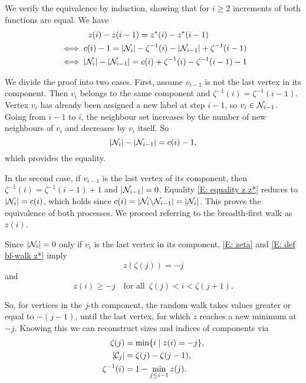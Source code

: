 We verify the equivalence by induction, showing that for $i \geq 2$ increments of both functions are equal.
We have
\begin{equation} \label{E: equality z z*}
\begin{aligned} 
&\hspace{35pt} z(i) - z(i-1) = z^*(i)  -z^*(i-1) \\
&\iff c(i) - 1 = |\mathcal{N}_{i}| - \zeta^{-1}(i) - |\mathcal{N}_{i-1}| + \zeta^{-1}(i-1) \\
&\iff |\mathcal{N}_{i}| - |\mathcal{N}_{i-1}| = c(i) + \zeta^{-1}(i) - \zeta^{-1}(i-1) - 1
\end{aligned}
\end{equation}

We divide the proof into two cases.
First, assume $v_{i-1}$ is not the last vertex in its component.
Then $v_i$ belongs to the same component and
$\zeta^{-1}(i) = \zeta^{-1}(i-1)$.
Vertex $v_i$ has already been assigned a new label at step $i-1$,
so $v_i \in \mathcal{N}_{i-1}$.
Going from $i-1$ to $i$,
the neighbour set increases by the number of new neighbours of $v_i$
and decreases by $v_i$ itself.
So
\begin{equation}
|\mathcal{N}_{i}| - |\mathcal{N}_{i-1}| = c(i) - 1,
\end{equation}
which provides the equality.

In the second case, if $v_{i-1}$ is the last vertex of its component,
then $\zeta^{-1}(i) = \zeta^{-1}(i-1) + 1$
and $|\mathcal{N}_{i-1}| = 0$.
Equality \eqref{E: equality z z*} reduces to
$ |\mathcal{N}_{i}| = c(i)$,
which holds since
$c(i) = |\mathcal{N}_{i} \backslash \mathcal{N}_{i-1}| = |\mathcal{N}_{i}|$.
This proves the equivalence of both processes.
We proceed referring to the breadth-first walk as $z(i)$.

\bigskip

Since $|\mathcal{N}_{i}| = 0$ only if $v_i$ is the last vertex in its component,
\eqref{E: zeta} and \eqref{E: def bf-walk z*} imply
\begin{equation} \label{E: (6).1}
	z(\zeta (j)) = -j
\end{equation}
and 
\begin{equation} \label{E: (6).2}
	z(i) \geq -j \quad \text{for all} \enspace \zeta(j) < i < \zeta(j+1).
\end{equation}

So, for vertices in the $j$-th component,
the random walk takes values greater or equal to $-(j-1)$,
until the last vertex, for which $z$ reaches a new minimum at $-j$.
Knowing this we can reconstruct sizes and indices of components via
\begin{align}
\zeta(j) &= \min \{ i \; | \; z(i) = -j \}, \label{E: zeta(j) = min(i)} \\
|\mathcal{C}_{j}| &= \zeta(j) - \zeta(j-1), \label{E: C(j) = zeta - zeta} \\
\zeta^{-1}(i) &= 1 - \min_{j \leq i-1}z(j). \label{E: zeta-1(i) = 1 - min(j)}
\end{align}


